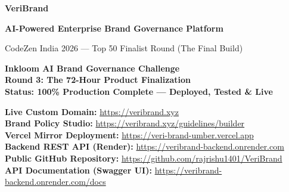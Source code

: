 \documentclass[11pt,a4paper]{article}
\begin{document}
\begin{titlepage}
    \centering
    \vspace*{1.5cm}

    {\Huge\bfseries\color{primaryblue} VeriBrand\par}
    \vspace{0.4cm}
    {\Large\textbf{AI-Powered Enterprise Brand Governance Platform}\par}
    \vspace{0.3cm}
    {\normalsize CodeZen India 2026 --- Top 50 Finalist Round (The Final Build)\par}
    \vspace{1.5cm}

    \begin{tcolorbox}[colback=lightgray, colframe=primaryblue, width=0.88\textwidth, arc=3mm, boxrule=1pt]
    \centering
    \textbf{Inkloom AI Brand Governance Challenge}\\
    \vspace{0.2cm}
    \textbf{Round 3: The 72-Hour Product Finalization}\\
    \vspace{0.2cm}
    \textbf{Status: 100\% Production Complete --- Deployed, Tested \& Live}
    \end{tcolorbox}

    \vspace{0.8cm}

    \begin{tcolorbox}[colback=successgreen!10, colframe=successgreen, width=0.88\textwidth, arc=2mm, boxrule=0.6pt, title=\textbf{Verified Live Access Links (Tested in Private Window)}]
    \textbf{Live Custom Domain:} \url{https://veribrand.xyz}\\
    \textbf{Brand Policy Studio:} \url{https://veribrand.xyz/guidelines/builder}\\
    \textbf{Vercel Mirror Deployment:} \url{https://veri-brand-umber.vercel.app}\\
    \textbf{Backend REST API (Render):} \url{https://veribrand-backend.onrender.com}\\
    \textbf{Public GitHub Repository:} \url{https://github.com/rajrishu1401/VeriBrand}\\
    \textbf{API Documentation (Swagger UI):} \url{https://veribrand-backend.onrender.com/docs}
    \end{tcolorbox}

    \vfill


\end{titlepage}
\end{document}
